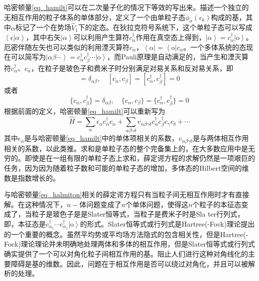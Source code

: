 哈密顿量\ref{eq_hamilt}可以在二次量子化的情况下等效的写出来。描述一个独立的无相互作用的粒子体系的单体部分，定义了一个由单粒子态$\phi_\alpha(\epsilon_k)$构成的基，其中$\alpha$标记了一个在势场$\widehat{V}_1$下的定态。在狄拉克符号系统下，这个单粒子态可以写成$\left<\epsilon|\alpha\right>$，其中右矢$\left|\alpha\right>$可以利用产生算符$c_\alpha^\dag$作用在真空态上得到，$\left|\alpha\right>=c_\alpha^\dag\left|\textrm{o}\right>$。厄密伴随左矢也可以类似的利用湮灭算符$c_\alpha$，$\left<\alpha\right|=\left<\textrm{o}\right|c_\alpha$。一个多体系统的态现在可以简写为$\left|\alpha\beta\cdots\right>=c_\alpha^\dag c_\beta^\dag\cdots\left|\textrm{o}\right>$，而Pauli原理是自动满足的，当产生和湮灭算符$c_\alpha^\dag$、$c_\alpha$，在粒子是玻色子和费米子时分别满足对易关系和反对易关系，即
\begin{equation*}
[c_\alpha,c_\beta^\dag]=\delta_{\alpha\beta},\quad[c_\alpha,c_\beta]=[c_\alpha^\dag,c_\beta^\dag]=0
\end{equation*}
或者
\begin{equation*}
\{c_\alpha,c_\beta^\dag\}=\delta_{\alpha\beta},\quad\{c_\alpha,c_\beta\}=\{c_\alpha^\dag,c_\beta^\dag\}=0
\end{equation*}
根据前面的定义，哈密顿量\ref{eq_hamilt}可以重新写为
\begin{equation}\label{eq_halmiton}
\widehat{H}=\sum_\alpha\epsilon_\alpha c_\alpha^\dag c_\alpha+\sum_{\alpha\beta\gamma\delta}v_{\alpha\beta\gamma\delta}c_\alpha^\dag c_\beta^\dag c_\gamma c_\delta+\cdots
\end{equation}
其中$\epsilon_\alpha$是与哈密顿量\ref{eq_hamilt}中的单体项相关的系数，$v_{\alpha\beta\gamma\delta}$是与两体相互作用相关的系数，以此类推。求和是单粒子态的整个完备集上的，在大多数应用中是无穷的。即使是在一组有限的单粒子态上求和，薛定谔方程的求解仍然是一项艰巨的任务，因为因为随着粒子数和可能的单粒子态的增加，多体态的Hilbert空间的维数是指数增长的。

与哈密顿量\ref{eq_halmiton}相关的薛定谔方程只有当粒子间无相互作用时才有直接解。在这种情况下，$n-$体问题变成了$n$个单体问题，使得这$n$个粒子的本征态变成了，当粒子是玻色子是是Slater恒等式，当粒子是费米子时是Sla	ter行列式，即，本征态是$c_{\alpha_1}^\dag\cdots c_{\alpha_1}^\dag\left|\textrm{o}\right>$的形式。Slater恒等式或行列式是Hartree(-Fock)理论提出的一个重要的概念。虽然平均势或平均场方法隐式的包含相关性，但是Hartree(-Fock)理论理论并未明确地处理两体和多体的相互作用，但是Slater恒等式或行列式确实提供了一个可以对角化粒子间相互作用的基。阻止人们进行这种对角线化的主要障碍是基的维数。因此，问题在于相互作用是否可以绕过对角化，并且可以被解析的处理。

